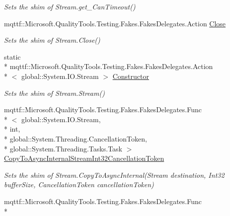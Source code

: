 \begin{DoxyCompactItemize}
\begin{DoxyCompactList}\small\item\em Sets the shim of Stream.\-get\-\_\-\-Can\-Timeout()\end{DoxyCompactList}\item 
mqttf\-::\-Microsoft.\-Quality\-Tools.\-Testing.\-Fakes.\-Fakes\-Delegates.\-Action \hyperlink{class_system_1_1_i_o_1_1_fakes_1_1_shim_stream_ad42bace57094b045aeea29dee4c61cc4}{Close}
\begin{DoxyCompactList}\small\item\em Sets the shim of Stream.\-Close()\end{DoxyCompactList}\item 
static \\*
mqttf\-::\-Microsoft.\-Quality\-Tools.\-Testing.\-Fakes.\-Fakes\-Delegates.\-Action\\*
$<$ global\-::\-System.\-I\-O.\-Stream $>$ \hyperlink{class_system_1_1_i_o_1_1_fakes_1_1_shim_stream_a8d34e6f79ebc6d7617caf4e2b3d77156}{Constructor}
\begin{DoxyCompactList}\small\item\em Sets the shim of Stream.\-Stream()\end{DoxyCompactList}\item 
mqttf\-::\-Microsoft.\-Quality\-Tools.\-Testing.\-Fakes.\-Fakes\-Delegates.\-Func\\*
$<$ global\-::\-System.\-I\-O.\-Stream, \\*
int, \\*
global\-::\-System.\-Threading.\-Cancellation\-Token, \\*
global\-::\-System.\-Threading.\-Tasks.\-Task $>$ \hyperlink{class_system_1_1_i_o_1_1_fakes_1_1_shim_stream_a72d3fda9cdf0317f4348dff23833135c}{Copy\-To\-Async\-Internal\-Stream\-Int32\-Cancellation\-Token}
\begin{DoxyCompactList}\small\item\em Sets the shim of Stream.\-Copy\-To\-Async\-Internal(\-Stream destination, Int32 buffer\-Size, Cancellation\-Token cancellation\-Token)\end{DoxyCompactList}\item 
mqttf\-::\-Microsoft.\-Quality\-Tools.\-Testing.\-Fakes.\-Fakes\-Delegates.\-Func\\*

\end{DoxyCompactItemize}
